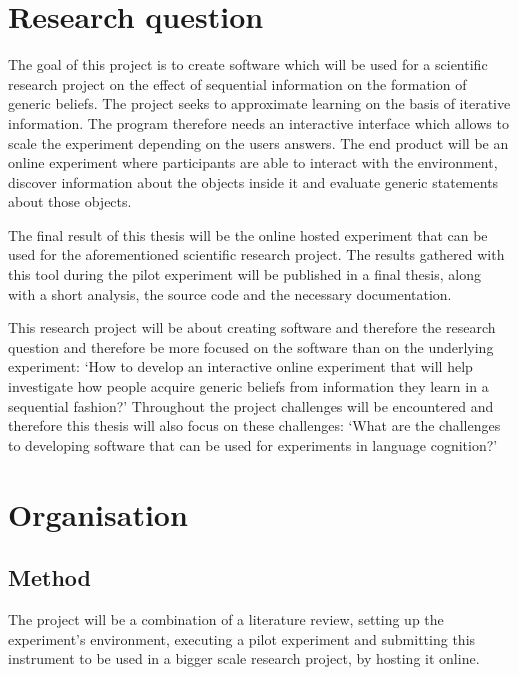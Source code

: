 \documentclass{uva-inf-article}
\begin{document}
\section{Research question}
The goal of this project is to create software which will be used for a scientific research project on the effect of sequential information on the formation of generic beliefs. The project seeks to approximate learning on the basis of iterative information. The program therefore needs an interactive interface which allows to scale the experiment depending on the users answers. The end product will be an online experiment where participants are able to interact with the environment, discover information about the objects inside it and evaluate generic statements about those objects. 

The final result of this thesis will be the online hosted experiment that can be used for the aforementioned scientific research project. The results gathered with this tool during the pilot experiment will be published in a final thesis, along with a short analysis, the source code and the necessary documentation.

This research project will be about creating software and therefore the research question and therefore be more focused on the software than on the underlying experiment: `How to develop an interactive online experiment that will help investigate how people acquire generic beliefs from information they learn in a sequential fashion?'
Throughout the project challenges will be encountered and therefore this thesis will also focus on these challenges: `What are the challenges to developing software that can be used for experiments in language cognition?'


\section{Organisation}
\subsection{Method}
The project will be a combination of a literature review, setting up the experiment's environment, executing a pilot experiment and submitting this instrument to be used in a bigger scale research project, by hosting it online.
\end{document}
